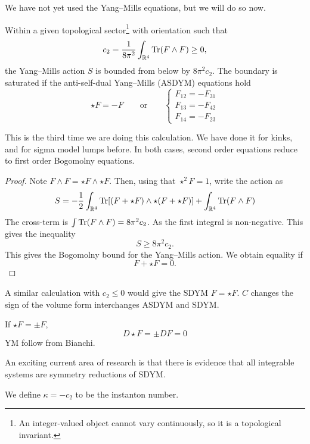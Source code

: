 We have not yet used the Yang--Mills equations, but we will do so now.
\begin{theorem}[]
  Within a given topological sector\footnote{An integer-valued object cannot vary continuously, so it is a topological invariant.} with orientation such that
  \begin{equation}
    c_2 = \frac{1}{8\pi^2} \int_{\mathbb{R}^4} \Tr(F \wedge F) \geq 0,
  \end{equation}
  the Yang--Mills action $S$ is bounded from below by $8 \pi^2 c_2$. The boundary is saturated if the anti-self-dual Yang--Mills (ASDYM) equations hold
  \begin{equation}
    {\star F} = - F \qquad \text{or} \qquad \left\{
      \begin{gathered}
        F_{12} = -F_{31} \\
        F_{13} = -F_{42} \\
        F_{14} = -F_{23}
      \end{gathered}
      \right.
  \end{equation}
\end{theorem}
\begin{remark}
  This is the third time we are doing this calculation. We have done it for kinks, and for sigma model lumps before.  In both cases, second order equations reduce to first order Bogomolny equations.
\end{remark}
\begin{proof}
  Note $F \wedge F = \star F \wedge \star F$.
  Then, using that ${\star^2 F} = 1$, write the action as
  \begin{equation}
    S = -\frac{1}{2} \int_{\mathbb{R}^4} \Tr[(F + \star F) \wedge \star(F + \star F)] + \int_{\mathbb{R}^4} \Tr(F \wedge F)
  \end{equation}
  The cross-term is $\int \Tr(F \wedge F) = 8 \pi^2 c_2$.
  As the first integral is non-negative. This gives the inequality
  \begin{equation}
    S \geq 8 \pi^2 c_2.
  \end{equation}
  This gives the Bogomolny bound for the Yang--Mills action. We obtain equality if
  \begin{equation}
    F + \star F = 0.
  \end{equation}
\end{proof}

A similar calculation with $c_2 \leq 0$ would give the SDYM $F = \star F$.
$C$ changes the sign of the volume form interchanges ASDYM and SDYM.

If $\star F = \pm F$, 
\begin{equation}
  D \star F = \pm D F = 0
\end{equation}
YM follow from Bianchi.

An exciting current area of research is that there is evidence that all integrable systems are symmetry reductions of SDYM.

We define $ \kappa = - c_2 $ to be the instanton number.
